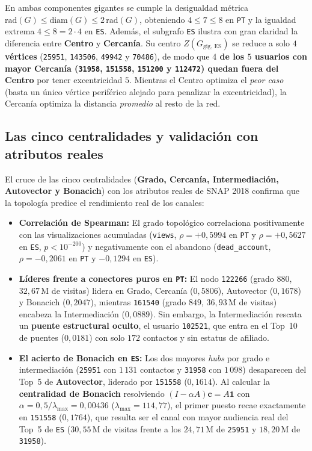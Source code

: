 \documentclass[11pt,a4paper]{article}
\begin{document}
En ambas componentes gigantes se cumple la desigualdad métrica $\text{rad}(G) \le \text{diam}(G) \le 2\,\text{rad}(G)$, obteniendo $4 \le 7 \le 8$ en \texttt{PT} y la igualdad extrema $4 \le 8 = 2 \cdot 4$ en \texttt{ES}. Además, el subgrafo \texttt{ES} ilustra con gran claridad la diferencia entre \textbf{Centro} y \textbf{Cercanía}. Su centro $Z(G_{\text{gig, ES}})$ se reduce a solo \textbf{$4$ vértices} (\texttt{25951}, \texttt{143506}, \texttt{49942} y \texttt{70486}), de modo que \textbf{$4$ de los $5$ usuarios con mayor Cercanía (\texttt{31958}, \texttt{151558}, \texttt{151200} y \texttt{112472}) quedan fuera del Centro} por tener excentricidad $5$. Mientras el Centro optimiza el \textit{peor caso} (basta un único vértice periférico alejado para penalizar la excentricidad), la Cercanía optimiza la distancia \textit{promedio} al resto de la red.

\subsection{Las cinco centralidades y validación con atributos reales}
El cruce de las cinco centralidades (\textbf{Grado, Cercanía, Intermediación, Autovector y Bonacich}) con los atributos reales de SNAP 2018 confirma que la topología predice el rendimiento real de los canales:
\begin{itemize}[leftmargin=*, itemsep=2pt]
  \item \textbf{Correlación de Spearman:} El grado topológico correlaciona positivamente con las visualizaciones acumuladas (\texttt{views}, $\rho = +0,5994$ en \texttt{PT} y $\rho = +0,5627$ en \texttt{ES}, $p < 10^{-200}$) y negativamente con el abandono (\texttt{dead\_account}, $\rho = -0,2061$ en \texttt{PT} y $-0,1294$ en \texttt{ES}).
  \item \textbf{Líderes frente a conectores puros en \texttt{PT}:} El nodo \texttt{122266} (grado $880$, $32,67$\,M de visitas) lidera en Grado, Cercanía ($0,5806$), Autovector ($0,1678$) y Bonacich ($0,2047$), mientras \texttt{161540} (grado $849$, $36,93$\,M de visitas) encabeza la Intermediación ($0,0889$). Sin embargo, la Intermediación rescata un \textbf{puente estructural oculto}, el usuario \texttt{102521}, que entra en el Top~10 de puentes ($0,0181$) con solo $172$ contactos y sin estatus de afiliado.
  \item \textbf{El acierto de Bonacich en \texttt{ES}:} Los dos mayores \textit{hubs} por grado e intermediación (\texttt{25951} con $1\,131$ contactos y \texttt{31958} con $1\,098$) desaparecen del Top~5 de \textbf{Autovector}, liderado por \texttt{151558} ($0,1614$). Al calcular la \textbf{centralidad de Bonacich} resolviendo $(I - \alpha A)\mathbf{c} = A\mathbf{1}$ con $\alpha = 0,5/\lambda_{\max} = 0,00436$ ($\lambda_{\max} = 114,77$), el primer puesto recae exactamente en \texttt{151558} ($0,1764$), que resulta ser el canal con mayor audiencia real del Top~5 de \texttt{ES} ($30,55$\,M de visitas frente a los $24,71$\,M de \texttt{25951} y $18,20$\,M de \texttt{31958}).
\end{itemize}
\end{document}
